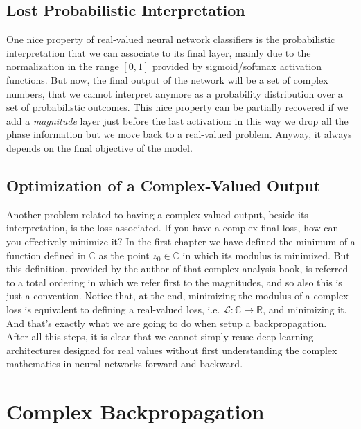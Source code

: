 \documentclass[../main.tex]{subfiles}
\begin{document}
\subsection*{Lost Probabilistic Interpretation}
One nice property of real-valued neural network classifiers is the probabilistic interpretation that we can associate to its final layer, mainly due to the normalization in the range $[0,1]$ provided by sigmoid/softmax activation functions. But now, the final output of the network will be a set of complex numbers, that we cannot interpret anymore as a probability distribution over a set of probabilistic outcomes. This nice property can be partially recovered if we add a \textit{magnitude} layer just before the last activation: in this way we drop all the phase information but we move back to a real-valued problem. Anyway, it always depends on the final objective of the model.

\subsection*{Optimization of a Complex-Valued Output}
Another problem related to having a complex-valued output, beside its interpretation, is the loss associated. If you have a complex final loss, how can you effectively minimize it? In the first chapter we have defined the minimum of a function defined in $\mathds{C}$ as the point $z_0\in\mathds{C}$ in which its modulus is minimized. But this definition, provided by the author of that complex analysis book, is referred to a total ordering in which we refer first to the magnitudes, and so also this is just a convention. Notice that, at the end, minimizing the modulus of a complex loss is equivalent to defining a real-valued loss, i.e. $\mathscr{L}:\mathds{C}\to\mathds{R}$, and minimizing it. And that's exactly what we are going to do when setup a backpropagation.\\

After all this steps, it is clear that we cannot simply reuse deep learning architectures designed for real values without first understanding the complex mathematics in neural networks forward and backward.

\section{Complex Backpropagation}
\label{sec:cmplx_backpropagation}
\end{document}
